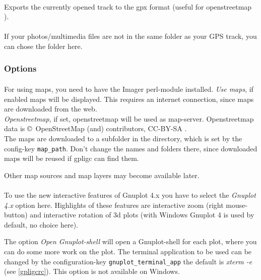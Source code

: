 \paragraph{%
}
Exports the currently opened track to the gpx format (useful for openstreetmap \cite{osm}).

\paragraph{%
}
If your photos/multimedia files are not in the same folder as your GPS track, you can chose the folder here.



\subsubsection{Options}

\paragraph{%
}
For using maps, you need to have the Imager perl-module installed.
\emph{Use maps}, if enabled maps will be displayed.
This requires an internet connection, since maps are downloaded from the web.\\
\emph{Openstreetmap}, if set, openstreetmap will be used as map-server.
Openstreetmap data is \copyright\ OpenStreetMap (and) contributors, CC-BY-SA \cite{osm}.\\

The maps are downloaded to a subfolder in the directory, which is set by the config-key \texttt{map\_path}.
Don't change the names and folders there, since downloaded maps will be reused if gpligc can find them.

Other map sources and map layers may become available later.


\paragraph{
}
To use the new interactive features of Gnuplot 4.x you have to select the \emph{Gnuplot 4.x} option here. Highlights of these features are interactive zoom (right mouse-button) and interactive rotation of 3d plots (with Windows Gnuplot 4 is used by default, no choice here).

The option \emph{Open Gnuplot-shell} will open a Gnuplot-shell for each plot, where you can do some more work on the plot. The  terminal application to be used can be changed by the configuration-key \texttt{gnuplot\_terminal\_app} the default is \emph{xterm -e} (see \ref{gpligcrc}).
This option is not available on Windows.

